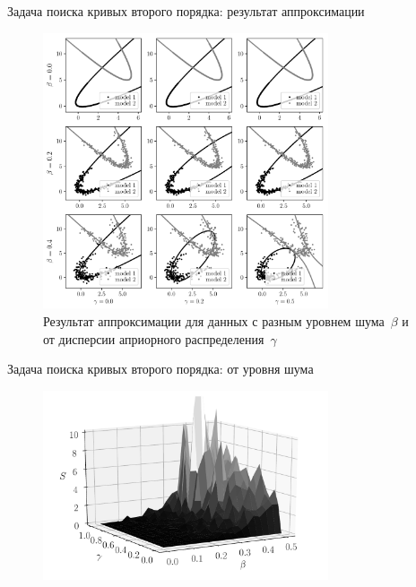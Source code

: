 \documentclass[9pt,pdf,hyperref={unicode}]{beamer}
\begin{document}
\begin{frame}{Задача поиска кривых второго порядка: результат аппроксимации}
\justifying

\begin{figure}[h!t]\center
\includegraphics[width=0.75\textwidth]{figures/beta_gamma}
\caption{Результат аппроксимации для данных с разным уровнем шума~$\beta$ и от дисперсии априорного распределения~$\gamma$}
\end{figure}

\end{frame}

\begin{frame}{Задача поиска кривых второго порядка: от уровня шума}
\justifying

\begin{figure}[h!t]\center
\includegraphics[width=0.75\textwidth]{figures/3dplot}
\end{figure}

\end{frame}
\end{document}
